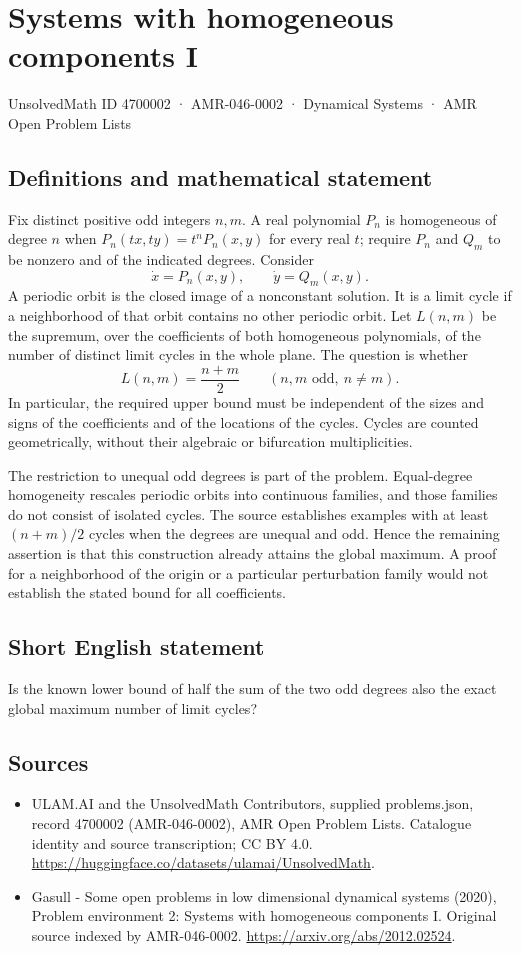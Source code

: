 \documentclass[11pt,a4paper]{article}
\begin{document}
\section*{Systems with homogeneous components I}\label{4700002}
{\small UnsolvedMath ID 4700002 · AMR-046-0002 · Dynamical Systems · AMR Open Problem Lists}
\subsection{Definitions and mathematical statement}
Fix distinct positive odd integers $n,m$. A real polynomial $P_n$ is homogeneous
of degree $n$ when $P_n(tx,ty)=t^nP_n(x,y)$ for every real $t$; require $P_n$
and $Q_m$ to be nonzero and of the indicated degrees. Consider
\[
 \dot x=P_n(x,y),\qquad \dot y=Q_m(x,y).
\]
A periodic orbit is the closed image of a nonconstant solution. It is a
limit cycle if a neighborhood of that orbit contains no other periodic orbit.
Let $L(n,m)$ be the supremum, over the coefficients of both homogeneous
polynomials, of the number of distinct limit cycles in the whole plane.
The question is whether
\[
 L(n,m)=\frac{n+m}{2}\qquad(n,m\text{ odd},\ n\ne m).
\]
In particular, the required upper bound must be independent of the sizes and
signs of the coefficients and of the locations of the cycles. Cycles are
counted geometrically, without their algebraic or bifurcation multiplicities.

The restriction to unequal odd degrees is part of the problem. Equal-degree
homogeneity rescales periodic orbits into continuous families, and those
families do not consist of isolated cycles. The source establishes examples
with at least $(n+m)/2$ cycles when the degrees are unequal and odd. Hence
the remaining assertion is that this construction already attains the global
maximum. A proof for a neighborhood of the origin or a particular perturbation
family would not establish the stated bound for all coefficients.
\subsection{Short English statement}
Is the known lower bound of half the sum of the two odd degrees also the exact global maximum number of limit cycles?
\subsection{Sources}
\begin{itemize}
\item[S1] ULAM.AI and the UnsolvedMath Contributors, supplied problems.json, record 4700002 (AMR-046-0002), AMR Open Problem Lists. Catalogue identity and source transcription; CC BY 4.0.
\url{https://huggingface.co/datasets/ulamai/UnsolvedMath}.
\item[S2] Gasull - Some open problems in low dimensional dynamical systems (2020), Problem environment 2: Systems with homogeneous components I. Original source indexed by AMR-046-0002.
\url{https://arxiv.org/abs/2012.02524}.
\end{itemize}
\end{document}

